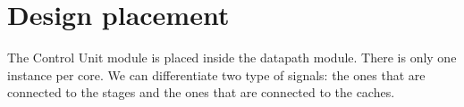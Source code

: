 \section{Design placement}
\label{chapter2}

The Control Unit module is placed inside the datapath module.
There is only one instance per core.
We can differentiate two type of signals: the ones that are connected to the stages and the ones that are connected to the caches.

